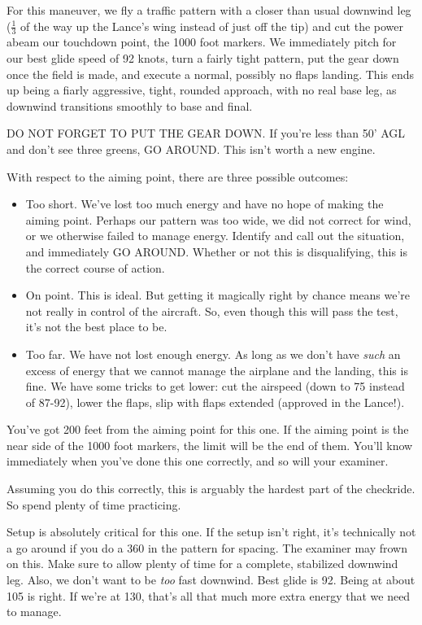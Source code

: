 For this maneuver, we fly a traffic pattern with a closer than usual downwind leg ($\frac1 3$ of the way up the Lance's wing instead of just off the tip) and cut the power abeam our touchdown point, the 1000 foot markers. We immediately pitch for our best glide speed of 92 knots, turn a fairly tight pattern, put the gear down once the field is made, and execute a normal, possibly no flaps landing. This ends up being a fiarly aggressive, tight, rounded approach, with no real base leg, as downwind transitions smoothly to base and final.

DO NOT FORGET TO PUT THE GEAR DOWN. If you're less than 50' AGL and don't see three greens, GO AROUND. This isn't worth a new engine.

With respect to the aiming point, there are three possible outcomes:

\begin{itemize}
\item{Too short.} We've lost too much energy and have no hope of making the aiming point. Perhaps our pattern was too wide, we did not correct for wind, or we otherwise failed to manage energy. Identify and call out the situation, and immediately GO AROUND. Whether or not this is disqualifying, this is the correct course of action.
\item{On point.} This is ideal. But getting it magically right by chance means we're not really in control of the aircraft. So, even though this will pass the test, it's not the best place to be.
\item{Too far.} We have not lost enough energy. As long as we don't have \emph{such} an excess of energy that we cannot manage the airplane and the landing, this is fine. We have some tricks to get lower: cut the airspeed (down to 75 instead of 87-92), lower the flaps, slip with flaps extended (approved in the Lance!).
\end{itemize}

You've got 200 feet from the aiming point for this one. If the aiming point is the near side of the 1000 foot markers, the limit will be the end of them. You'll know immediately when you've done this one correctly, and so will your examiner.

Assuming you do this correctly, this is arguably the hardest part of the checkride. So spend plenty of time practicing.

Setup is absolutely critical for this one. If the setup isn't right, it's technically not a go around if you do a 360 in the pattern for spacing. The examiner may frown on this. Make sure to allow plenty of time for a complete, stabilized downwind leg. Also, we don't want to be \emph{too} fast downwind. Best glide is 92. Being at about 105 is right. If we're at 130, that's all that much more extra energy that we need to manage.

